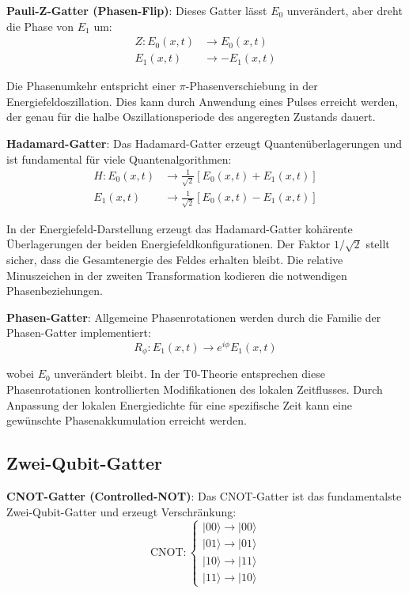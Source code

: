 \documentclass[12pt,a4paper]{article}
\theoremstyle{definition}
\theoremstyle{remark}
\begin{document}
\textbf{Pauli-Z-Gatter (Phasen-Flip)}:
Dieses Gatter l{\"a}sst $E_0$ unver{\"a}ndert, aber dreht die Phase von $E_1$ um:
\begin{align}
	Z: E_0(x,t) &\rightarrow E_0(x,t) \\
	E_1(x,t) &\rightarrow -E_1(x,t)
\end{align}

Die Phasenumkehr entspricht einer $\pi$-Phasenverschiebung in der Energiefeldoszillation. Dies kann durch Anwendung eines Pulses erreicht werden, der genau f{\"u}r die halbe Oszillationsperiode des angeregten Zustands dauert.

\textbf{Hadamard-Gatter}:
Das Hadamard-Gatter erzeugt Quanten{\"u}berlagerungen und ist fundamental f{\"u}r viele Quantenalgorithmen:
\begin{align}
	H: E_0(x,t) &\rightarrow \frac{1}{\sqrt{2}}[E_0(x,t) + E_1(x,t)] \\
	E_1(x,t) &\rightarrow \frac{1}{\sqrt{2}}[E_0(x,t) - E_1(x,t)]
\end{align}

In der Energiefeld-Darstellung erzeugt das Hadamard-Gatter koh{\"a}rente {\"U}berlagerungen der beiden Energiefeldkonfigurationen. Der Faktor $1/\sqrt{2}$ stellt sicher, dass die Gesamtenergie des Feldes erhalten bleibt. Die relative Minuszeichen in der zweiten Transformation kodieren die notwendigen Phasenbeziehungen.

\textbf{Phasen-Gatter}:
Allgemeine Phasenrotationen werden durch die Familie der Phasen-Gatter implementiert:
\begin{equation}
	R_\phi: E_1(x,t) \rightarrow e^{i\phi} E_1(x,t)
\end{equation}

wobei $E_0$ unver{\"a}ndert bleibt. In der T0-Theorie entsprechen diese Phasenrotationen kontrollierten Modifikationen des lokalen Zeitflusses. Durch Anpassung der lokalen Energiedichte f{\"u}r eine spezifische Zeit kann eine gew{\"u}nschte Phasenakkumulation erreicht werden.

\subsection{Zwei-Qubit-Gatter}

\textbf{CNOT-Gatter (Controlled-NOT)}:
Das CNOT-Gatter ist das fundamentalste Zwei-Qubit-Gatter und erzeugt Verschr{\"a}nkung:
\begin{equation}
	\text{CNOT}: \begin{cases}
		|00\rangle \rightarrow |00\rangle \\
		|01\rangle \rightarrow |01\rangle \\
		|10\rangle \rightarrow |11\rangle \\
		|11\rangle \rightarrow |10\rangle
	\end{cases}
\end{equation}
\end{document}
